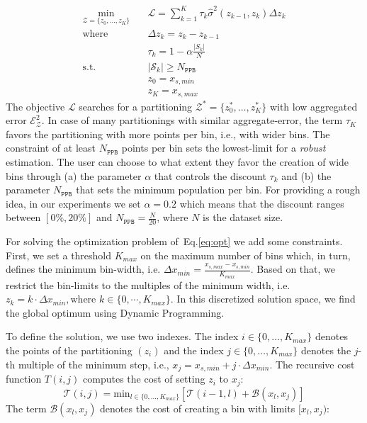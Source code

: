 \documentclass[twoside]{article}
\begin{document}
\begin{equation}
  \label{eq:opt}
\begin{aligned}
  \min_{ \mathcal{Z} = \{z_0, \ldots, z_K\}} \quad & \mathcal{L} = \sum_{k=1}^K \tau_k \hat{\sigma}^2(z_{k-1}, z_k) \Delta z_k \\
  \textrm{where} \quad & \Delta z_k = z_k - z_{k-1} \\
  & \tau_k = 1 - \alpha \frac{|S_k|}{N} \\
  \textrm{s.t.} \quad & |\mathcal{S}_k| \geq N_{\mathtt{PPB}}\\
                                     & z_0 = x_{s,min}\\
                                     & z_K = x_{s, max}
\end{aligned}
\end{equation}
%
The objective \(\mathcal{L}\) searches for a partitioning
\(\mathcal{Z}^* = \{ z_0^*, \ldots, z_K^* \} \) with low aggregated error
\(\mathcal{E}_{\mathcal{Z}}^2\). In case of many partitionings with
similar aggregate-error, the term \(\tau_K\) favors the partitioning
with more points per bin, i.e., with wider bins. The constraint of at
least \(N_{\mathtt{PPB}}\) points per bin sets the lowest-limit for a
\textit{robust} estimation. The user can choose to what extent they
favor the creation of wide bins through (a) the parameter \(\alpha\)
that controls the discount \(\tau_k\) and (b) the parameter
\(N_{\mathtt{PPB}}\) that sets the minimum population per bin. For
providing a rough idea, in our experiments we set \(\alpha = 0.2\)
which means that the discount ranges between \([0\%, 20\%]\) and
\(N_{\mathtt{PPB}} = \frac{N}{20}\), where \(N\) is the dataset size.

For solving the optimization problem of~Eq.\ref{eq:opt} we add some
constraints. First, we set a threshold \(K_{max}\) on the maximum
number of bins which, in turn, defines the minimum bin-width,
i.e. \(\Delta x_{min} = \frac{x_{s, max} - x_{s,min}}{K_{max}}\).
Based on that, we restrict the bin-limits to the multiples of the
minimum width, i.e.
\(z_k = k\cdot \Delta x_{min}, \text{where } k \in \{0 , \cdots,
K_{max}\} \). In this discretized solution space, we find the global
optimum using Dynamic Programming. 

To define the solution, we use two indexes. The index
\(i \in \{0, \ldots, K_{max}\}\) denotes the points of the
partitioning \((z_i)\) and the index \(j \in \{0, \ldots, K_{max}\} \)
denotes the \(j\)-th multiple of the minimum step, i.e.,
\(x_j = x_{s,min} + j \cdot \Delta x_{min}\). The recursive cost
function \(T(i,j)\) computes the cost of setting \(z_i\) to \(x_j\):
\begin{equation}
  \label{eq:recursive_cost}
  \mathcal{T}(i,j) = \mathrm{min}_{l \in \{0, \ldots, K_{max}\}} \left [ \mathcal{T}(i-1, l) + \mathcal{B}(x_l, x_j) \right ]
\end{equation}
%
The term \(\mathcal{B}(x_l, x_j)\) denotes the cost of creating a bin with
limits \([x_l, x_j)\):
\end{document}
